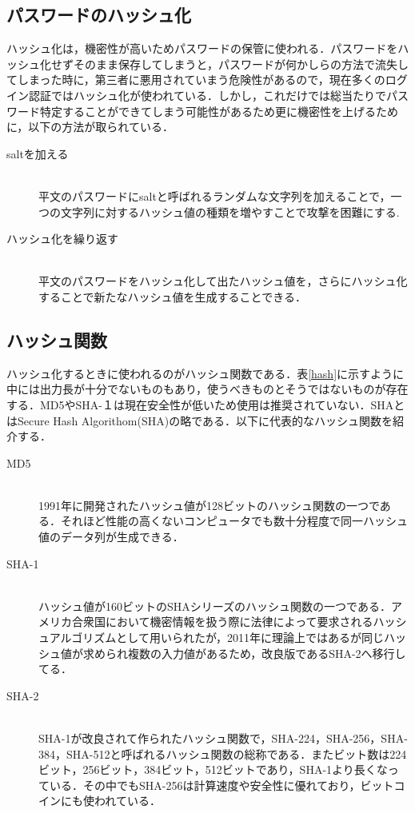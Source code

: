 \documentclass[a4j,11pt]{jsarticle}
\begin{document}
\subsection{パスワードのハッシュ化}
ハッシュ化は，機密性が高いためパスワードの保管に使われる．パスワードをハッシュ化せずそのまま保存してしまうと，パスワードが何かしらの方法で流失してしまった時に，第三者に悪用されていまう危険性があるので，現在多くのログイン認証ではハッシュ化が使われている．しかし，これだけでは総当たりでパスワード特定することができてしまう可能性があるため更に機密性を上げるために，以下の方法が取られている．
\begin{description}
   \item[saltを加える]\mbox{}\\ 平文のパスワードにsaltと呼ばれるランダムな文字列を加えることで，一つの文字列に対するハッシュ値の種類を増やすことで攻撃を困難にする. 
   
 \item[ハッシュ化を繰り返す]\mbox{}\\平文のパスワードをハッシュ化して出たハッシュ値を，さらにハッシュ化することで新たなハッシュ値を生成することできる．

\end{description}

\newpage

\subsection{ハッシュ関数}
ハッシュ化するときに使われるのがハッシュ関数である．表\ref{hash}に示すように中には出力長が十分でないものもあり，使うべきものとそうではないものが存在する．MD5やSHA-１は現在安全性が低いため使用は推奨されていない．SHAとはSecure Hash Algorithom(SHA)の略である．以下に代表的なハッシュ関数を紹介する．

\begin{description}
   \item[MD5]\mbox{}\\ 1991年に開発されたハッシュ値が128ビットのハッシュ関数の一つである．それほど性能の高くないコンピュータでも数十分程度で同一ハッシュ値のデータ列が生成できる．
   \item[SHA-1]\mbox{}\\ ハッシュ値が160ビットのSHAシリーズのハッシュ関数の一つである．アメリカ合衆国において機密情報を扱う際に法律によって要求されるハッシュアルゴリズムとして用いられたが，2011年に理論上ではあるが同じハッシュ値が求められ複数の入力値があるため，改良版であるSHA-2へ移行してる．
   \item[SHA-2]\mbox{}\\ SHA-1が改良されて作られたハッシュ関数で，SHA-224，SHA-256，SHA-384，SHA-512と呼ばれるハッシュ関数の総称である．またビット数は224ビット，256ビット，384ビット，512ビットであり，SHA-1より長くなっている．その中でもSHA-256は計算速度や安全性に優れており，ビットコインにも使われている．
\end{description}
\end{document}
